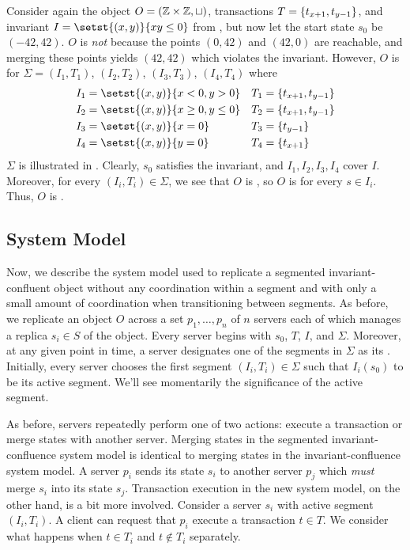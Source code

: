 {}

\begin{example}
  Consider again the object $O = (\mathbb{Z} \times \mathbb{Z}, \sqcup)$, transactions $T
  = \{t_{x+1}, t_{y-1}\}$, and invariant $I = \setst{(x, y)}{xy \leq 0}$ from
  , but now let the start state $s_0$ be $(-42, 42)$. $O$ is
  \emph{not} \sTISconfluent{} because the points $(0, 42)$ and $(42, 0)$ are
  reachable, and merging these points yields $(42, 42)$ which violates the
  invariant. However, $O$ is \sTISconfluent{} for $\Sigma = (I_1, T_1)$, $(I_2,
  T_2)$, $(I_3, T_3)$, $(I_4, T_4)$ where
  \begin{align*}
    I_1 &= \setst{(x, y)}{x < 0, y > 0}       &T_1 &= \set{t_{x+1}, t_{y-1}} \\
    I_2 &= \setst{(x, y)}{x \geq 0, y \leq 0} &T_2 &= \set{t_{x+1}, t_{y-1}} \\
    I_3 &= \setst{(x, y)}{x = 0}              &T_3 &= \set{t_{y-1}} \\
    I_4 &= \setst{(x, y)}{y = 0}              &T_4 &= \set{t_{x+1}}
  \end{align*}
  $\Sigma$ is illustrated in . Clearly, $s_0$ satisfies the
  invariant, and $I_1, I_2, I_3, I_4$ cover $I$. Moreover, for every $(I_i,
  T_i) \in \Sigma$, we see that $O$ is , so $O$ is
   for every $s \in I_i$. Thus, $O$ is
  \sTISconfluent{}.
\end{example}

\subsection{System Model}
Now, we describe the system model used to replicate a segmented
invariant-confluent object without any coordination within a segment and with
only a small amount of coordination when transitioning between segments. As
before, we replicate an object $O$ across a set $p_1, \ldots, p_n$ of $n$
servers each of which manages a replica $s_i \in S$ of the object. Every server
begins with $s_0$, $T$, $I$, and $\Sigma$. Moreover, at any given point in
time, a server designates one of the segments in $\Sigma$ as its
.  Initially, every server chooses the first segment
$(I_i, T_i) \in \Sigma$ such that $I_i(s_0)$ to be its active segment. We'll
see momentarily the significance of the active segment.

As before, servers repeatedly perform one of two actions: execute a transaction
or merge states with another server. Merging states in the segmented
invariant-confluence system model is identical to merging states in the
invariant-confluence system model. A server $p_i$ sends its state $s_i$ to
another server $p_j$ which \emph{must} merge $s_i$ into its state $s_j$.
%
Transaction execution in the new system model, on the other hand, is a bit more
involved. Consider a server $s_i$ with active segment $(I_i, T_i)$. A client
can request that $p_i$ execute a transaction $t \in T$. We consider what
happens when $t \in T_i$ and $t \notin T_i$ separately.

